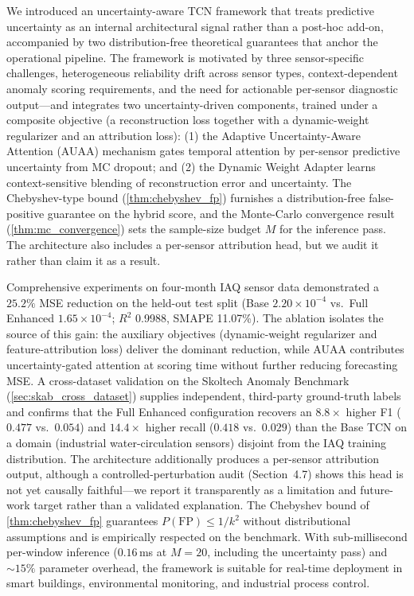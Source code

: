 
We introduced an uncertainty-aware TCN framework that treats predictive uncertainty as an internal architectural signal rather than a post-hoc add-on, accompanied by two distribution-free theoretical guarantees that anchor the operational pipeline. The framework is motivated by three sensor-specific challenges, heterogeneous reliability drift across sensor types, context-dependent anomaly scoring requirements, and the need for actionable per-sensor diagnostic output---and integrates two uncertainty-driven components, trained under a composite objective (a reconstruction loss together with a dynamic-weight regularizer and an attribution loss): (1) the Adaptive Uncertainty-Aware Attention (AUAA) mechanism gates temporal attention by per-sensor predictive uncertainty from MC dropout; and (2) the Dynamic Weight Adapter learns context-sensitive blending of reconstruction error and uncertainty. The Chebyshev-type bound (\cref{thm:chebyshev_fp}) furnishes a distribution-free false-positive guarantee on the hybrid score, and the Monte-Carlo convergence result (\cref{thm:mc_convergence}) sets the sample-size budget $M$ for the inference pass. The architecture also includes a per-sensor attribution head, but we audit it rather than claim it as a result.

Comprehensive experiments on four-month IAQ sensor data demonstrated a $25.2\%$ MSE reduction on the held-out test split (Base $2.20\times 10^{-4}$ vs.\ Full Enhanced $1.65\times 10^{-4}$; $R^2$ 0.9988, SMAPE 11.07\%). The ablation isolates the source of this gain: the auxiliary objectives (dynamic-weight regularizer and feature-attribution loss) deliver the dominant reduction, while AUAA contributes uncertainty-gated attention at scoring time without further reducing forecasting MSE. A cross-dataset validation on the Skoltech Anomaly Benchmark (\cref{sec:skab_cross_dataset}) supplies independent, third-party ground-truth labels and confirms that the Full Enhanced configuration recovers an $8.8\times$ higher F1 ($0.477$ vs.\ $0.054$) and $14.4\times$ higher recall ($0.418$ vs.\ $0.029$) than the Base TCN on a domain (industrial water-circulation sensors) disjoint from the IAQ training distribution. The architecture additionally produces a per-sensor attribution output, although a controlled-perturbation audit (Section~4.7) shows this head is not yet causally faithful---we report it transparently as a limitation and future-work target rather than a validated explanation. The Chebyshev bound of \cref{thm:chebyshev_fp} guarantees $P(\text{FP}) \leq 1/k^2$ without distributional assumptions and is empirically respected on the benchmark. With sub-millisecond per-window inference ($0.16$\,ms at $M=20$, including the uncertainty pass) and $\sim 15\%$ parameter overhead, the framework is suitable for real-time deployment in smart buildings, environmental monitoring, and industrial process control.

